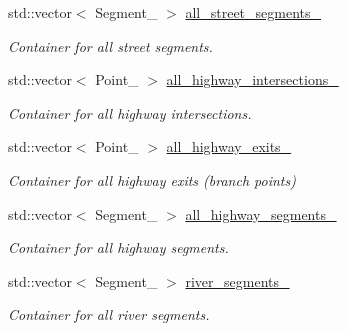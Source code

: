 \begin{DoxyCompactItemize}
\hypertarget{class_entity_container_af4e20ae8193a2b910f8a928dc72cbd75}{}\label{class_entity_container_af4e20ae8193a2b910f8a928dc72cbd75} 
std\+::vector$<$ Segment\+\_ $>$ \hyperlink{class_entity_container_af4e20ae8193a2b910f8a928dc72cbd75}{all\+\_\+street\+\_\+segments\+\_\+}
\begin{DoxyCompactList}\small\item\em Container for all street segments. \end{DoxyCompactList}\item 
\hypertarget{class_entity_container_ae2d78a8360b2ebf66c537f4659fc4d75}{}\label{class_entity_container_ae2d78a8360b2ebf66c537f4659fc4d75} 
std\+::vector$<$ Point\+\_ $>$ \hyperlink{class_entity_container_ae2d78a8360b2ebf66c537f4659fc4d75}{all\+\_\+highway\+\_\+intersections\+\_\+}
\begin{DoxyCompactList}\small\item\em Container for all highway intersections. \end{DoxyCompactList}\item 
\hypertarget{class_entity_container_a674902cc4f07335f3a241e10aa3d6456}{}\label{class_entity_container_a674902cc4f07335f3a241e10aa3d6456} 
std\+::vector$<$ Point\+\_ $>$ \hyperlink{class_entity_container_a674902cc4f07335f3a241e10aa3d6456}{all\+\_\+highway\+\_\+exits\+\_\+}
\begin{DoxyCompactList}\small\item\em Container for all highway exits (branch points) \end{DoxyCompactList}\item 
\hypertarget{class_entity_container_ac63e745f9bff741c72f413141a8f9b94}{}\label{class_entity_container_ac63e745f9bff741c72f413141a8f9b94} 
std\+::vector$<$ Segment\+\_ $>$ \hyperlink{class_entity_container_ac63e745f9bff741c72f413141a8f9b94}{all\+\_\+highway\+\_\+segments\+\_\+}
\begin{DoxyCompactList}\small\item\em Container for all highway segments. \end{DoxyCompactList}\item 
\hypertarget{class_entity_container_a73a5483cb36051add961774e28fb086c}{}\label{class_entity_container_a73a5483cb36051add961774e28fb086c} 
std\+::vector$<$ Segment\+\_ $>$ \hyperlink{class_entity_container_a73a5483cb36051add961774e28fb086c}{river\+\_\+segments\+\_\+}
\begin{DoxyCompactList}\small\item\em Container for all river segments. \end{DoxyCompactList}\item 

\end{DoxyCompactItemize}
